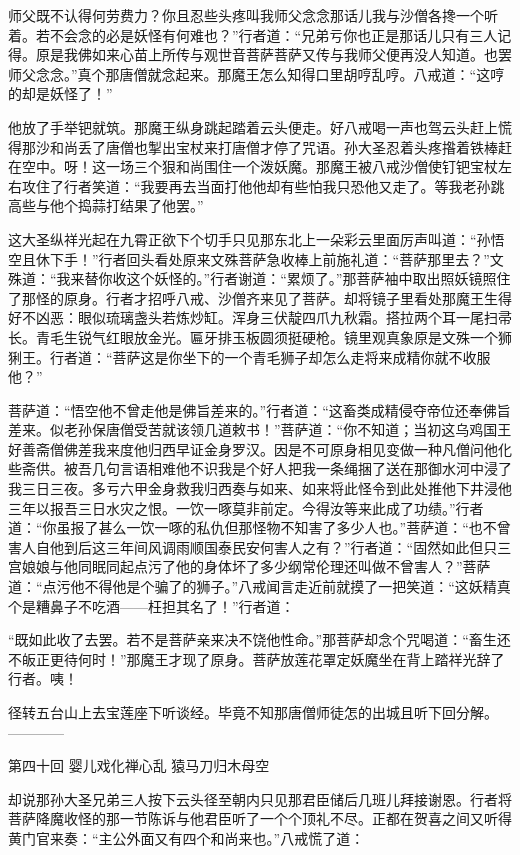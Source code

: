 \documentclass[12pt,UTF8]{ctexbook}
\begin{document}
师父既不认得何劳费力？你且忍些头疼叫我师父念念那话儿我与沙僧各搀一个听着。若不会念的必是妖怪有何难也？”行者道：“兄弟亏你也正是那话儿只有三人记得。原是我佛如来心苗上所传与观世音菩萨菩萨又传与我师父便再没人知道。也罢师父念念。”真个那唐僧就念起来。那魔王怎么知得口里胡哼乱哼。八戒道：“这哼的却是妖怪了！”

他放了手举钯就筑。那魔王纵身跳起踏着云头便走。好八戒喝一声也驾云头赶上慌得那沙和尚丢了唐僧也掣出宝杖来打唐僧才停了咒语。孙大圣忍着头疼揝着铁棒赶在空中。呀！这一场三个狠和尚围住一个泼妖魔。那魔王被八戒沙僧使钉钯宝杖左右攻住了行者笑道：“我要再去当面打他他却有些怕我只恐他又走了。等我老孙跳高些与他个捣蒜打结果了他罢。”

这大圣纵祥光起在九霄正欲下个切手只见那东北上一朵彩云里面厉声叫道：“孙悟空且休下手！”行者回头看处原来文殊菩萨急收棒上前施礼道：“菩萨那里去？”文殊道：“我来替你收这个妖怪的。”行者谢道：“累烦了。”那菩萨袖中取出照妖镜照住了那怪的原身。行者才招呼八戒、沙僧齐来见了菩萨。却将镜子里看处那魔王生得好不凶恶：眼似琉璃盏头若炼炒缸。浑身三伏靛四爪九秋霜。搭拉两个耳一尾扫帚长。青毛生锐气红眼放金光。匾牙排玉板圆须挺硬枪。镜里观真象原是文殊一个狮猁王。行者道：“菩萨这是你坐下的一个青毛狮子却怎么走将来成精你就不收服他？”

菩萨道：“悟空他不曾走他是佛旨差来的。”行者道：“这畜类成精侵夺帝位还奉佛旨差来。似老孙保唐僧受苦就该领几道敕书！”菩萨道：“你不知道；当初这乌鸡国王好善斋僧佛差我来度他归西早证金身罗汉。因是不可原身相见变做一种凡僧问他化些斋供。被吾几句言语相难他不识我是个好人把我一条绳捆了送在那御水河中浸了我三日三夜。多亏六甲金身救我归西奏与如来、如来将此怪令到此处推他下井浸他三年以报吾三日水灾之恨。一饮一啄莫非前定。今得汝等来此成了功绩。”行者道：“你虽报了甚么一饮一啄的私仇但那怪物不知害了多少人也。”菩萨道：“也不曾害人自他到后这三年间风调雨顺国泰民安何害人之有？”行者道：“固然如此但只三宫娘娘与他同眠同起点污了他的身体坏了多少纲常伦理还叫做不曾害人？”菩萨道：“点污他不得他是个骗了的狮子。”八戒闻言走近前就摸了一把笑道：“这妖精真个是糟鼻子不吃酒——枉担其名了！”行者道：

“既如此收了去罢。若不是菩萨亲来决不饶他性命。”那菩萨却念个咒喝道：“畜生还不皈正更待何时！”那魔王才现了原身。菩萨放莲花罩定妖魔坐在背上踏祥光辞了行者。咦！

径转五台山上去宝莲座下听谈经。毕竟不知那唐僧师徒怎的出城且听下回分解。
------------

第四十回 婴儿戏化禅心乱 猿马刀归木母空

却说那孙大圣兄弟三人按下云头径至朝内只见那君臣储后几班儿拜接谢恩。行者将菩萨降魔收怪的那一节陈诉与他君臣听了一个个顶礼不尽。正都在贺喜之间又听得黄门官来奏：“主公外面又有四个和尚来也。”八戒慌了道：
\end{document}
